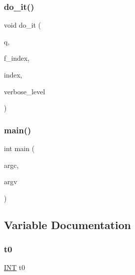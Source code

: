 \subsubsection{\texorpdfstring{do\+\_\+it()}{do\_it()}}
{\footnotesize\ttfamily void do\+\_\+it (\begin{DoxyParamCaption}\item[{\mbox{\hyperlink{galois_8h_a09fddde158a3a20bd2dcadb609de11dc}{I\+NT}}}]{q,  }\item[{\mbox{\hyperlink{galois_8h_a09fddde158a3a20bd2dcadb609de11dc}{I\+NT}}}]{f\+\_\+index,  }\item[{\mbox{\hyperlink{galois_8h_a09fddde158a3a20bd2dcadb609de11dc}{I\+NT}}}]{index,  }\item[{\mbox{\hyperlink{galois_8h_a09fddde158a3a20bd2dcadb609de11dc}{I\+NT}}}]{verbose\+\_\+level }\end{DoxyParamCaption})}

\mbox{\label{winnie__li_8_c_a3c04138a5bfe5d72780bb7e82a18e627}} 
\subsubsection{\texorpdfstring{main()}{main()}}
{\footnotesize\ttfamily int main (\begin{DoxyParamCaption}\item[{int}]{argc,  }\item[{char $\ast$$\ast$}]{argv }\end{DoxyParamCaption})}



\subsection{Variable Documentation}
\mbox{\label{winnie__li_8_c_a4268f4fe222ffb119218a0199f5e1904}} 
\subsubsection{\texorpdfstring{t0}{t0}}
{\footnotesize\ttfamily \mbox{\hyperlink{galois_8h_a09fddde158a3a20bd2dcadb609de11dc}{I\+NT}} t0}

